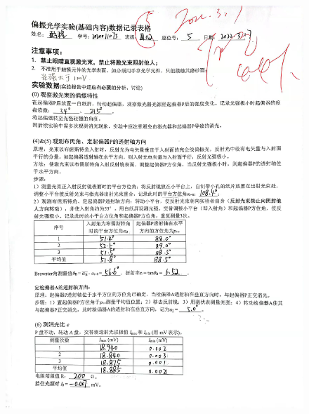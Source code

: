 \documentclass[UTF8]{ctexart}
\begin{document}
\begin{figure}[H]
  \centering
  \includegraphics[scale=0.13]{1.jpg}
\end{figure}
\end{document}
